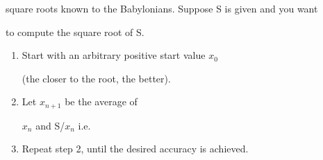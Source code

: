 square roots known to the Babylonians. Suppose S is given and you want

to compute the square root of S.



\begin{enumerate}

\item

  Start with an arbitrary positive start value $x_0$

  (the closer to the root, the better).

\item

  Let $x_{n+1}$ be the average of

  $x_n$ and S/$x_n$ i.e.


\item

  Repeat step 2, until the desired accuracy is achieved.

\end{enumerate}

